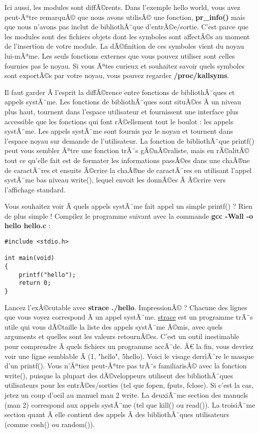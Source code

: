 \documentclass[11pt]{article}
\begin{document}
Ici aussi, les modules sont diffÃ©rents. Dans l'exemple hello world, vous avez peut-Ãªtre remarquÃ© que nous avons utilisÃ© une fonction, \textbf{pr\_info()} mais que nous n'avons pas inclut de bibliothÃ¨que d'entrÃ©e/sortie. C'est parce que les modules sont des fichiers objets dont les symboles sont affectÃ©s au moment de l'insertion de votre module. La dÃ©finition de ces symboles vient du noyau lui-mÃªme. Les seuls fonctions externes que vous pouvez utiliser sont celles fournies pas le noyau. Si vous Ãªtes curieux et souhaitez savoir quels symboles sont exportÃ©s par votre noyau, vous pouvez regarder \textbf{/proc/kallsyms}.

Il faut garder Ã  l'esprit la diffÃ©rence entre fonctions de bibliothÃ¨ques et appels systÃ¨me. Les fonctions de bibliothÃ¨ques sont situÃ©es Ã  un niveau plus haut, tournent dans l'espace utilisateur et fournissent une interface plus accessible que les fonctions qui font rÃ©ellement tout le boulot : les appels systÃ¨me. Les appels systÃ¨me sont fournis par le noyau et tournent dans l'espace noyau sur demande de l'utilisateur. La fonction de bibliothÃ¨que printf() peut vous sembler Ãªtre une fonction trÃ¨s gÃ©nÃ©raliste, mais en rÃ©alitÃ© tout ce qu'elle fait est de formater les informations passÃ©es dans une chaÃ®ne de caractÃ¨res et ensuite Ã©crire la chaÃ®ne de caractÃ¨res en utilisant l'appel systÃ¨me bas niveau write(), lequel envoit les donnÃ©es Ã  Ã©crire vers l'affichage standard.

Vous souhaitez voir Ã  quels appels systÃ¨me fait appel un simple printf() ? Rien de plus simple ! Compilez le programme suivant avec la commande \textbf{gcc -Wall -o hello hello.c} :

\begin{verbatim}
#include <stdio.h>

int main(void)
{
    printf("hello");
    return 0;
}
\end{verbatim}

Lancez l'exÃ©cutable avec \textbf{strace ./hello}. ImpressionÃ© ? Chacune des lignes que vous voyez correspond Ã  un appel systÃ¨me. \href{https://strace.io/}{strace} est un programme trÃ¨s utile qui vous dÃ©taille la liste des appels systÃ¨me Ã©mis, avec quels arguments et quelles sont les valeurs retournÃ©es. C'est un outil inestimable pour comprendre Ã  quels fichiers un programme accÃ¨de. Ã€ la fin, vous devriez voir une ligne semblable Ã  (1, "hello", 5hello). Voici le visage derriÃ¨re le masque d'un printf(). Vous n'Ãªtiez peut-Ãªtre pas trÃ¨s familiarisÃ© avec la fonction write(), puisque la plupart des dÃ©veloppeurs utilisent des bibliothÃ¨ques utilisateurs pour les entrÃ©es/sorties (tel que fopen, fputs, fclose). Si c'est la cas, jetez un coup d'oeil au manuel man 2 write. La deuxiÃ¨me section des manuels (man 2) correspond aux appels systÃ¨me (tel que kill() ou read()). La troisiÃ¨me section quant Ã  elle contient des appels Ã  des bibliothÃ¨ques utilisateurs (comme cosh() ou random()).
\end{document}
